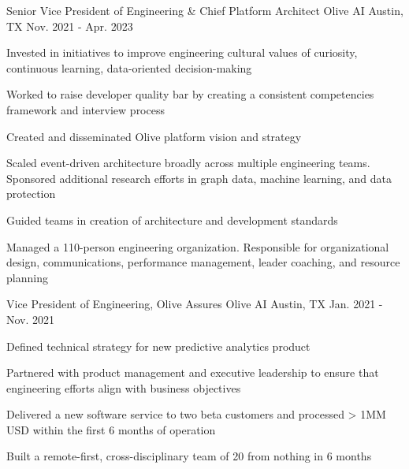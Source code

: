 


\begin{cventries}


\cventry
{Senior Vice President of Engineering \& Chief Platform Architect}
{Olive AI}
{Austin, TX}
{Nov. 2021 - Apr. 2023}
{
  \begin{cvitems}
    \item{Invested in initiatives to improve engineering cultural values of curiosity, continuous learning, data-oriented decision-making}
    \item{Worked to raise developer quality bar by creating a consistent competencies framework and interview process}
    \item{Created and disseminated Olive platform vision and strategy}
    \item{Scaled event-driven architecture broadly across multiple engineering teams. Sponsored additional research efforts in graph data, machine learning, and data protection}
    \item{Guided teams in creation of architecture and development standards}
    \item{Managed a 110-person engineering organization. Responsible for organizational design, communications, performance management, leader coaching, and resource planning}
  \end{cvitems}
}
    

\cventry
{Vice President of Engineering, Olive Assures}
{Olive AI}
{Austin, TX}
{Jan. 2021 - Nov. 2021}
{
  \begin{cvitems}
    \item {Defined technical strategy for new predictive analytics product}
    \item {Partnered with product management and executive leadership to ensure that engineering efforts align with business objectives}
    \item {Delivered a new software service to two beta customers and processed > 1MM USD within the first 6 months of operation}
    \item {Built a remote-first, cross-disciplinary team of 20 from nothing in 6 months}
  \end{cvitems}
}


\end{cventries}
